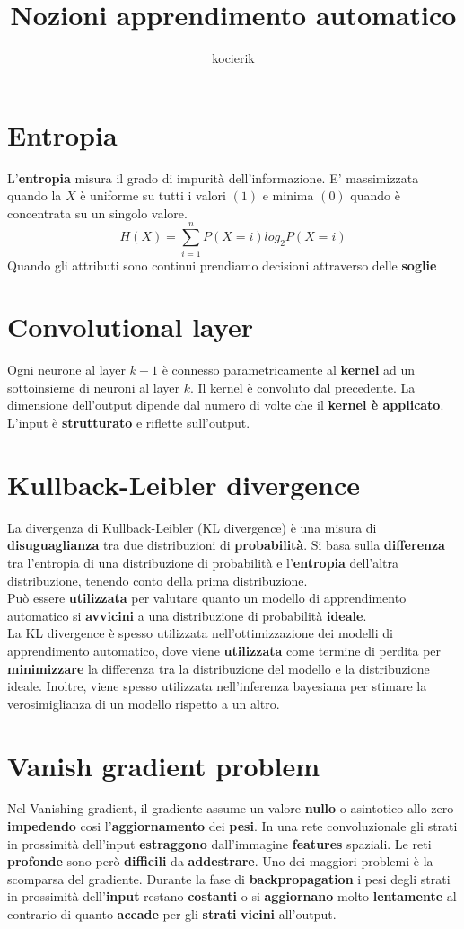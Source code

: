 \documentclass{article}
\title{Nozioni apprendimento automatico}
\author{kocierik}
\begin{document}
\maketitle
\tableofcontents

\section{Entropia}
L'\textbf{entropia} misura il grado di impurità dell'informazione. E' massimizzata quando la $X$ è uniforme su tutti i valori $(1)$ e minima $(0)$ quando è concentrata su un singolo valore.
$$H(X) = \sum_{i=1}^n P(X=i)log_2P(X=i)$$
Quando gli attributi sono continui prendiamo decisioni attraverso delle \textbf{soglie}

\section{Convolutional layer}
Ogni neurone al layer $k-1$ è connesso parametricamente al \textbf{kernel} ad un sottoinsieme di neuroni al layer $k$. Il kernel è convoluto dal precedente. La dimensione dell'output dipende dal numero di volte che il \textbf{kernel è applicato}. L'input è \textbf{strutturato} e riflette sull'output.

\section{Kullback-Leibler divergence}
La divergenza di Kullback-Leibler (KL divergence) è una misura di \textbf{disuguaglianza} tra due distribuzioni di \textbf{probabilità}. Si basa sulla \textbf{differenza} tra l'entropia di una distribuzione di probabilità e l'\textbf{entropia} dell'altra distribuzione, tenendo conto della prima distribuzione.\\
 Può essere \textbf{utilizzata} per valutare quanto un modello di apprendimento automatico si \textbf{avvicini} a una distribuzione di probabilità \textbf{ideale}.\\
 La KL divergence è spesso utilizzata nell'ottimizzazione dei modelli di apprendimento automatico, dove viene \textbf{utilizzata} come termine di perdita per \textbf{minimizzare} la differenza tra la distribuzione del modello e la distribuzione ideale. Inoltre, viene spesso utilizzata nell'inferenza bayesiana per stimare la verosimiglianza di un modello rispetto a un altro.
 

\section{Vanish gradient problem}
Nel Vanishing gradient, il gradiente assume un valore \textbf{nullo} o asintotico allo zero \textbf{impedendo} cosi l’\textbf{aggiornamento} dei \textbf{pesi}. In una rete convoluzionale gli strati in prossimità dell’input \textbf{estraggono} dall'immagine \textbf{features} spaziali. Le reti \textbf{profonde} sono però \textbf{difficili} da \textbf{addestrare}. Uno dei maggiori problemi è la scomparsa del gradiente. Durante la fase di \textbf{backpropagation} i pesi degli strati in prossimità dell’\textbf{input} restano \textbf{costanti} o si \textbf{aggiornano} molto \textbf{lentamente} al contrario di quanto \textbf{accade} per gli \textbf{strati} \textbf{vicini} all’output.
\end{document}
